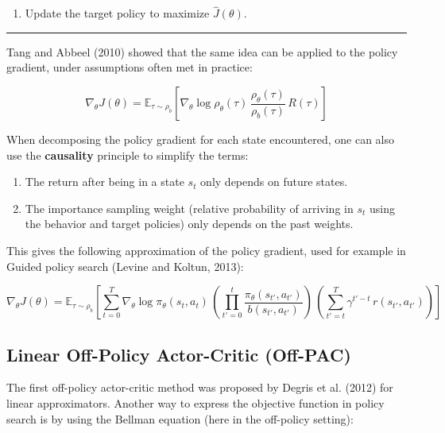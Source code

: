 \documentclass[
  letterpaper,
  DIV=11,
  numbers=noendperiod]{scrreprt}
\providecommand{\tightlist}{%
  \setlength{\itemsep}{0pt}\setlength{\parskip}{0pt}}\usepackage{longtable,booktabs,array}
\begin{document}
\begin{enumerate}
\def\labelenumi{\arabic{enumi}.}
\setcounter{enumi}{2}
\tightlist
\item
  Update the target policy to maximize \(\hat{J}(\theta)\).
\end{enumerate}

\begin{center}\rule{0.5\linewidth}{0.5pt}\end{center}

Tang and Abbeel (2010) showed that the same idea can be applied to the
policy gradient, under assumptions often met in practice:

\[
    \nabla_\theta J(\theta) =  \mathbb{E}_{\tau \sim \rho_b}[ \nabla_\theta \log \rho_\theta(\tau) \, \frac{\rho_\theta(\tau)}{\rho_b(\tau)} \, R(\tau)]
\]

When decomposing the policy gradient for each state encountered, one can
also use the \textbf{causality} principle to simplify the terms:

\begin{enumerate}
\def\labelenumi{\arabic{enumi}.}
\item
  The return after being in a state \(s_t\) only depends on future
  states.
\item
  The importance sampling weight (relative probability of arriving in
  \(s_t\) using the behavior and target policies) only depends on the
  past weights.
\end{enumerate}

This gives the following approximation of the policy gradient, used for
example in Guided policy search (Levine and Koltun, 2013):

\[
    \nabla_\theta J(\theta) =  \mathbb{E}_{\tau \sim \rho_b}[ \sum_{t=0}^T \nabla_\theta \log \pi_\theta(s_t, a_t) \, \left(\prod_{t'=0}^t \frac{\pi_\theta(s_{t'}, a_{t'})}{b(s_{t'}, a_{t'})} \right) \, \left(\sum_{t'=t}^T \gamma^{t'-t} \, r(s_{t'}, a_{t'}) \right)]
\]

\hypertarget{linear-off-policy-actor-critic-off-pac}{%
\subsection{Linear Off-Policy Actor-Critic
(Off-PAC)}\label{linear-off-policy-actor-critic-off-pac}}

The first off-policy actor-critic method was proposed by Degris et al.
(2012) for linear approximators. Another way to express the objective
function in policy search is by using the Bellman equation (here in the
off-policy setting):
\end{document}
